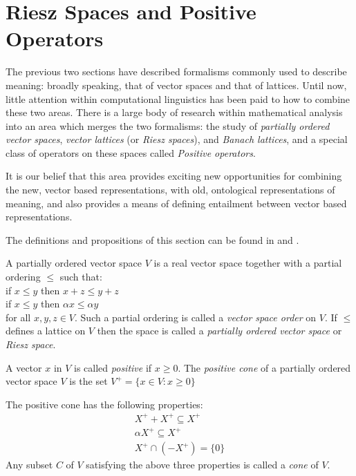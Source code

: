 \documentclass{report}
\begin{document}
\section{Riesz Spaces and Positive Operators}

The previous two sections have described formalisms commonly used to describe meaning: broadly speaking, that of vector spaces and that of lattices. Until now, little attention within computational linguistics has been paid to how to combine these two areas. There is a large body of research within mathematical analysis into an area which merges the two formalisms: the study of \emph{partially ordered vector spaces}, \emph{vector lattices} (or \emph{Riesz spaces}), and \emph{Banach lattices}, and a special class of operators on these spaces called \emph{Positive operators}.

It is our belief that this area provides exciting new opportunities for combining the new, vector based representations, with old, ontological representations of meaning, and also provides a means of defining entailment between vector based representations.

The definitions and propositions of this section can be found in \cite{Abramovich:00} and \cite{Aliprantis:85}.

\begin{defn}
A partially ordered vector space $V$ is a real vector space together with a partial ordering $\le$ such that:
\vspace{0.1cm}\\
\indent if $x \le y$ then $x + z \le y + z$\\
\indent if $x \le y$ then $\alpha x \le \alpha y$
\vspace{0.1cm}\\
for all $x,y,z \in V$. Such a partial ordering is called a \emph{vector space order} on $V$. If $\le$ defines a lattice on $V$ then the space is called a \emph{partially ordered vector space} or \emph{Riesz space}.

A vector $x$ in $V$ is called \emph{positive} if $x \ge 0$. The \emph{positive cone} of a partially ordered vector space $V$ is the set $V^+ = \{x \in V : x \ge 0\}$
\end{defn}

The positive cone has the following properties:
\begin{eqnarray*}
X^+ + X^+ \subseteq X^+\\
\alpha X^+ \subseteq X^+\\
X^+ \cap (-X^+) = \{0\}
\end{eqnarray*}
Any subset $C$ of $V$ satisfying the above three properties is called a \emph{cone} of $V$.
\end{document}
